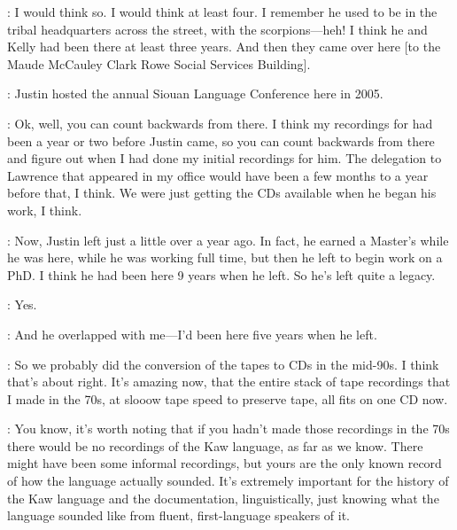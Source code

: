 \documentclass[output=paper]{LSP/langsci}
\begin{document}
: I would think so. I would think at least four. I remember he used to be in the tribal headquarters across the street, with the scorpions---heh! I think he and Kelly had been there at least three years. And then they came over here [to the Maude McCauley Clark Rowe Social Services Building].

: Justin hosted the annual Siouan Language Conference here in 2005. 

: Ok, well, you can count backwards from there. I think my recordings for  had been a year or two before Justin came, so you can count backwards from there and figure out when I had done my initial recordings for him. The delegation to Lawrence that appeared in my office would have been a few months to a year before that, I think. We were just getting the CDs available when he began his work, I think.

: Now, Justin left just a little over a year ago. In fact, he earned a Master's while he was here, while he was working full time, but then he left to begin work on a PhD. I think he had been here 9 years when he left. So he's left quite a legacy.

: Yes.

: And he overlapped with me---I'd been here five years when he left.

: So we probably did the conversion of the tapes to CDs in the mid-90s. I think that's about right. It's amazing now, that the entire stack of tape recordings that I made in the 70s, at slooow tape speed to preserve tape, all fits on one CD now.

: You know, it's worth noting that if you hadn't made those recordings in the 70s there would be no recordings of the Kaw language, as far as we know. There might have been some informal recordings, but yours are the only known record of how the language actually sounded. It's extremely important for the history of the Kaw language and the documentation, linguistically, just knowing what the language sounded like from fluent, first-language speakers of it.
\end{document}
